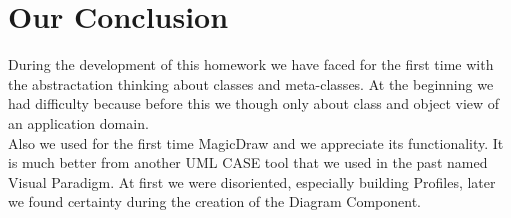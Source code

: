 \chapter{\textbf{Our Conclusion}}

During the development of this homework we have faced for the first time with the abstractation thinking about classes and meta-classes. At the beginning we had difficulty because before this we though only about class and object view of an application domain. 
\\Also we used for the first time MagicDraw and we appreciate its functionality. It is much better from another UML CASE tool that we used in the past named Visual Paradigm. At first we were disoriented, especially building Profiles, later we found certainty during the creation of the Diagram Component.
